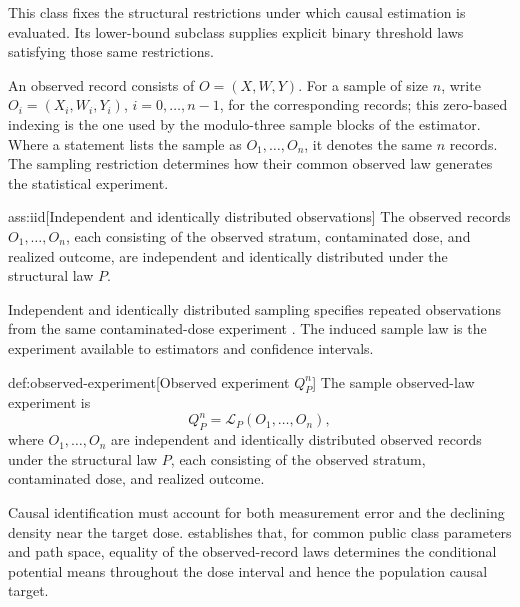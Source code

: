 This class fixes the structural restrictions under which causal estimation is evaluated. Its lower-bound subclass supplies explicit binary threshold laws satisfying those same restrictions.

An observed record  consists of \(O=(X,W,Y)\). For a sample of size \(n\), write \(O_i=(X_i,W_i,Y_i)\), \(i=0,\ldots,n-1\), for the corresponding records; this zero-based indexing is the one used by the modulo-three sample blocks of the estimator. Where a statement lists the sample as \(O_1,\ldots,O_n\), it denotes the same \(n\) records. The sampling restriction determines how their common observed law generates the statistical experiment.

\begin{assumptionv}{ass:iid}[Independent and identically distributed observations]
The observed records \(O_1,\ldots,O_n\), each consisting of the observed stratum, contaminated dose, and realized outcome, are independent and identically distributed under the structural law \(P\).
\end{assumptionv}

Independent and identically distributed sampling specifies repeated observations from the same contaminated-dose experiment \citep{HuangZhang2023}. The induced sample law  is the experiment available to estimators and confidence intervals.

\begin{definitionv}{def:observed-experiment}[Observed experiment \(Q_P^n\)]
The sample observed-law experiment is
\[
Q_P^n=\mathcal L_P(O_1,\ldots,O_n),
\]
where \(O_1,\ldots,O_n\) are independent and identically distributed observed records under the structural law \(P\), each consisting of the observed stratum, contaminated dose, and realized outcome.
\end{definitionv}

Causal identification must account for both measurement error and the declining density near the target dose.  establishes that, for common public class parameters and path space, equality of the observed-record laws determines the conditional potential means throughout the dose interval and hence the population causal target.


